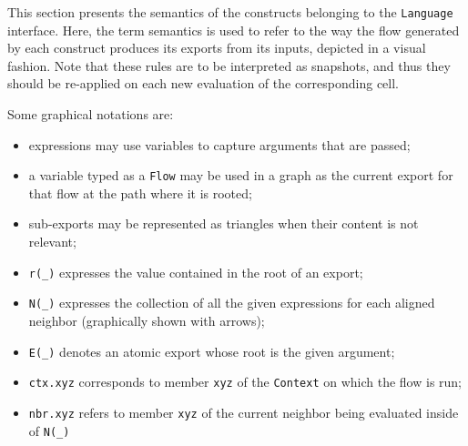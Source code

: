 This section presents the semantics of the constructs belonging to the \texttt{Language} interface.
%
Here, the term semantics is used to refer to the way the flow generated by each construct produces its exports from its inputs, depicted in a visual fashion.
%
Note that these rules are to be interpreted as snapshots, and thus they should be re-applied on each new evaluation of the corresponding cell.

Some graphical notations are:
%
\begin{itemize}
    \item expressions may use variables to capture arguments that are passed;
    \item a variable typed as a \texttt{Flow} may be used in a graph as the current export for that flow at the path where it is rooted;
    \item sub-exports may be represented as triangles when their content is not relevant;
    \item \texttt{r(\_)} expresses the value contained in the root of an export;
    \item \texttt{N(\_)} expresses the collection of all the given expressions for each aligned neighbor (graphically shown with arrows);
    \item \texttt{E(\_)} denotes an atomic export whose root is the given argument;
    \item \texttt{ctx.xyz} corresponds to member \texttt{xyz} of the \texttt{Context} on which the flow is run;
    \item \texttt{nbr.xyz} refers to member \texttt{xyz} of the current neighbor being evaluated inside of \texttt{N(\_)}
\end{itemize}

